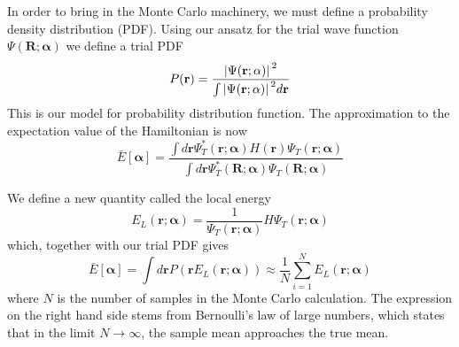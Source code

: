 \documentclass[a4paper, 10pt, english]{revtex4-2} %
\begin{document}
        In order to bring in the Monte Carlo machinery, we must define a probability density distribution (PDF). Using our ansatz for the trial wave function $\Psi(\mathbf{R}; \mathbf{\alpha})$ we define a trial PDF
        \begin{equation}
                P(\mathbf{r})
            =   \frac{\abs*{\Psi(\mathbf{r}; \mathbf{\alpha})}^2}{\int \abs*{\Psi(\mathbf{r}; \mathbf{\alpha})}^2 d\mathbf{r}}
        \end{equation}
        This is our model for probability distribution function. The approximation to the expectation value of the Hamiltonian is now
        \begin{equation}
                \bar{E}[\mathbf{\alpha}]
            =   \frac{\int d\mathbf{r}\Psi_T^*(\mathbf{r};\mathbf{\alpha})H(\mathbf{r})\Psi_T(\mathbf{r};\mathbf{\alpha})}{\int d\mathbf{r} \Psi_T^*(\mathbf{R};\mathbf{\alpha})\Psi_T(\mathbf{R};\mathbf{\alpha})}
        \end{equation}


        We define a new quantity called the local energy
        \begin{equation}
                E_L(\mathbf{r};\mathbf{\alpha})
            =   \frac{1}{\Psi_T(\mathbf{r};\mathbf{\alpha})}H\Psi_T(\mathbf{r};\mathbf{\alpha})
        \end{equation}
        which, together with our trial PDF gives
        \begin{equation}
                \bar{E}[\mathbf{\alpha}]
            =   \int d\mathbf{r} P(\mathbf{r} E_L(\mathbf{r};\mathbf{\alpha}))
            \approx
                \frac{1}{N}\sum_{i=1}^N E_L(\mathbf{r};\mathbf{\alpha})
        \end{equation}
        where $N$ is the number of samples in the Monte Carlo calculation.
        The expression on the right hand side stems from Bernoulli's law of large numbers, which states that in the limit $N \to \infty$, the sample mean approaches the true mean.
\end{document}
